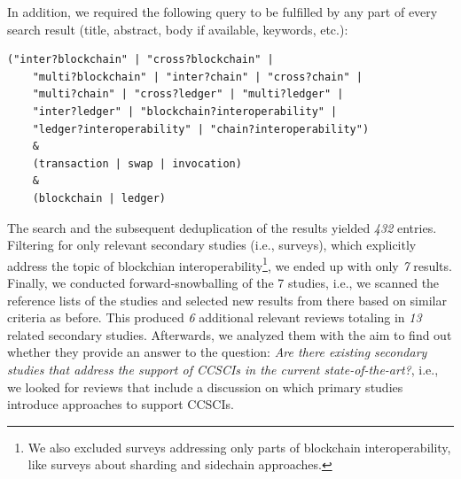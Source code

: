 \documentclass[review]{elsarticle}
\begin{document}
In addition, we required the following query to be fulfilled by any part of every search result (title, abstract, body if available, keywords, etc.):
\begin{lstlisting}[caption={The query term used to search for primary and secondary studies.},label={lst:query-string}]
	("inter?blockchain" | "cross?blockchain" | 
	"multi?blockchain" | "inter?chain" | "cross?chain" |
	"multi?chain" | "cross?ledger" | "multi?ledger" | 
	"inter?ledger" | "blockchain?interoperability" | 
	"ledger?interoperability" | "chain?interoperability") 
	& 
	(transaction | swap | invocation)
	&
	(blockchain | ledger)
\end{lstlisting}

The search and the subsequent deduplication of the results yielded \textit{432} entries.
Filtering for only relevant secondary studies (i.e., surveys), which explicitly address the topic of blockchian interoperability\footnote{We also excluded surveys addressing only parts of blockchain interoperability, like surveys about sharding and sidechain approaches.}, we ended up with only \textit{7} results.
Finally, we conducted forward-snowballing of the 7 studies, i.e., we scanned the reference lists of the studies and selected new results from there based on similar criteria as before.
This produced \textit{6} additional relevant reviews totaling in \textit{13} related secondary studies.
Afterwards, we analyzed them with the aim to find out whether they provide an answer to the question: \textit{Are there existing secondary studies that address the support of CCSCIs in the current state-of-the-art?}, i.e., we looked for reviews that include a discussion on which primary studies introduce approaches to support CCSCIs.
\end{document}
